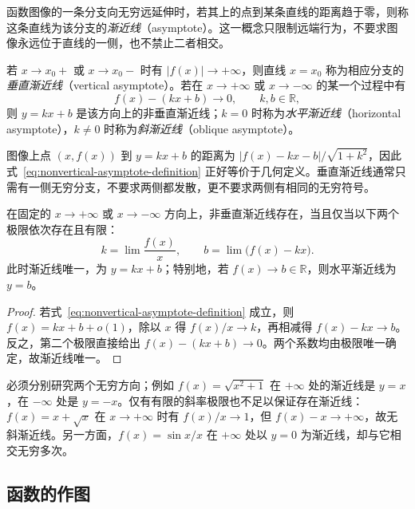 函数图像的一条分支向无穷远延伸时，若其上的点到某条直线的距离趋于零，则称这条直线为该分支的\emph{渐近线}（asymptote）。这一概念只限制远端行为，不要求图像永远位于直线的一侧，也不禁止二者相交。

\begin{definition}
\label{def:vertical-horizontal-oblique-asymptotes}
若 $x\to x_0+$ 或 $x\to x_0-$ 时有 $|f(x)|\to+\infty$，则直线 $x=x_0$ 称为相应分支的\emph{垂直渐近线}（vertical asymptote）。若在 $x\to+\infty$ 或 $x\to-\infty$ 的某一个过程中有
\begin{equation}
    f(x)-(kx+b)\to0,\qquad k,b\in\mathbb{R},
    \label{eq:nonvertical-asymptote-definition}
\end{equation}
则 $y=kx+b$ 是该方向上的非垂直渐近线；$k=0$ 时称为\emph{水平渐近线}（horizontal asymptote），$k\neq0$ 时称为\emph{斜渐近线}（oblique asymptote）。
\end{definition}

图像上点 $(x,f(x))$ 到 $y=kx+b$ 的距离为 $|f(x)-kx-b|/\sqrt{1+k^2}$，因此式~\eqref{eq:nonvertical-asymptote-definition} 正好等价于几何定义。垂直渐近线通常只需有一侧无穷分支，不要求两侧都发散，更不要求两侧有相同的无穷符号。

\begin{proposition}[非垂直渐近线的计算]
\label{prop:asymptote-slope-and-intercept}
在固定的 $x\to+\infty$ 或 $x\to-\infty$ 方向上，非垂直渐近线存在，当且仅当以下两个极限依次存在且有限：
\begin{equation}
    k=\lim\frac{f(x)}x,\qquad
    b=\lim\bigl(f(x)-kx\bigr).
    \label{eq:asymptote-slope-and-intercept}
\end{equation}
此时渐近线唯一，为 $y=kx+b$；特别地，若 $f(x)\to b\in\mathbb{R}$，则水平渐近线为 $y=b$。
\end{proposition}

\begin{proof}
若式~\eqref{eq:nonvertical-asymptote-definition} 成立，则 $f(x)=kx+b+o(1)$，除以 $x$ 得 $f(x)/x\to k$，再相减得 $f(x)-kx\to b$。反之，第二个极限直接给出 $f(x)-(kx+b)\to0$。两个系数均由极限唯一确定，故渐近线唯一。
\end{proof}

必须分别研究两个无穷方向；例如 $f(x)=\sqrt{x^2+1}$ 在 $+\infty$ 处的渐近线是 $y=x$，在 $-\infty$ 处是 $y=-x$。仅有有限的斜率极限也不足以保证存在渐近线：$f(x)=x+\sqrt{x}$ 在 $x\to+\infty$ 时有 $f(x)/x\to1$，但 $f(x)-x\to+\infty$，故无斜渐近线。另一方面，$f(x)=\sin x/x$ 在 $+\infty$ 处以 $y=0$ 为渐近线，却与它相交无穷多次。

\subsection{函数的作图}
\label{subsec:graphing-functions}

